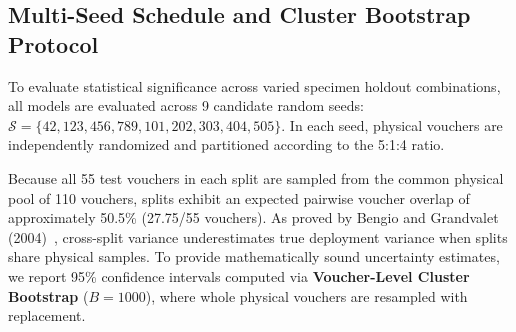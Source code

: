 \documentclass[a4paper,fleqn]{cas-sc}
\begin{document}
\subsection{Multi-Seed Schedule and Cluster Bootstrap Protocol}
To evaluate statistical significance across varied specimen holdout combinations, all models are evaluated across 9 candidate random seeds: $\mathcal{S} = \{42, 123, 456, 789, 101, 202, 303, 404, 505\}$. In each seed, physical vouchers are independently randomized and partitioned according to the 5:1:4 ratio.

Because all 55 test vouchers in each split are sampled from the common physical pool of 110 vouchers, splits exhibit an expected pairwise voucher overlap of approximately 50.5\% (27.75/55 vouchers). As proved by Bengio and Grandvalet (2004)~\cite{bengio2004}, cross-split variance underestimates true deployment variance when splits share physical samples. To provide mathematically sound uncertainty estimates, we report 95\% confidence intervals computed via \textbf{Voucher-Level Cluster Bootstrap} ($B=1000$), where whole physical vouchers are resampled with replacement.
\end{document}
